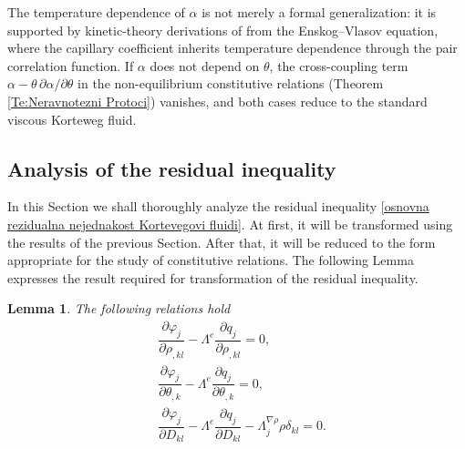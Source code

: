 \documentclass[a4paper,fleqn]{cas-sc}
\newtheorem{lemma}{Lemma}[section]
\theoremstyle{definition}
\begin{document}
The temperature dependence of $\alpha$ is not merely a formal generalization: it is supported by kinetic-theory derivations of \cite{bhattacharjee2024temperature} from the Enskog--Vlasov equation, where the capillary coefficient inherits temperature dependence through the pair correlation function. If $\alpha$ does not depend on $\theta$, the cross-coupling term $\alpha - \theta\,\partial\alpha/\partial\theta$ in the non-equilibrium constitutive relations (Theorem \ref{Te:Neravnotezni Protoci}) vanishes, and both cases reduce to the standard viscous Korteweg fluid. 

\subsection{Analysis of the residual inequality}

In this Section we shall thoroughly analyze the residual inequality \eqref{osnovna rezidualna nejednakost Kortevegovi fluidi}. At first, it will be transformed using the results of the previous Section. After that, it will be reduced to the form appropriate for the study of constitutive relations. The following Lemma expresses the result required for transformation of the residual inequality. 

\begin{lemma} \label{Lema:phi_j jednakosti}
	The following relations hold 
	\begin{align}
		\label{X_jrho_,kl prim Kortevegovi fluidi}
		& \dfrac{\partial\varphi_j}{\partial\rho_{,kl}}-\Lambda^e\dfrac{\partial q_j}{\partial\rho_{,kl}}=0, 
		\\
		\label{X_jtheta_,k prim Kortevegovi fluidi}
		& \dfrac{\partial\varphi_j}{\partial\theta_{,k}}-\Lambda^e\dfrac{\partial q_j}{\partial\theta_{,k}}=0, 
		\\
		\label{X_jD_kl prim Kortevegovi fluidi}
		& \dfrac{\partial\varphi_j}{\partial D_{kl}}-\Lambda^e\dfrac{\partial q_j}{\partial D_{kl}}-\Lambda^{\nabla\rho}_j\rho\delta_{kl}=0.
	\end{align}
\end{lemma}
\end{document}
